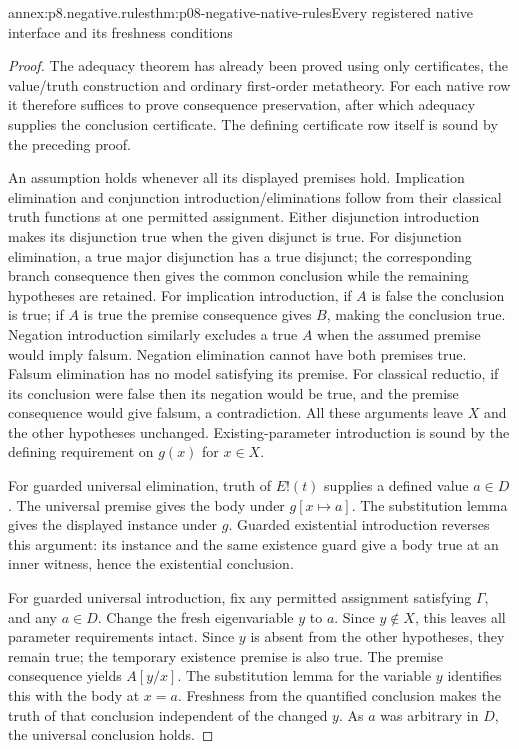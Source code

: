 \begin{annexitem}{annex:p8.negative.rules}{thm:p08-negative-native-rules}{Every registered native interface and its freshness conditions}
\begin{proof}
The adequacy theorem has already been proved using only certificates,
the value/truth construction and ordinary first-order metatheory.
For each native row it therefore suffices to prove consequence
preservation, after which adequacy supplies the conclusion certificate.
The defining certificate row itself is sound by the preceding proof.

An assumption holds whenever all its displayed premises hold.
Implication elimination and conjunction introduction/eliminations follow
from their classical truth functions at one permitted assignment.
Either disjunction introduction makes its disjunction true when the given
disjunct is true. For disjunction elimination, a true major disjunction
has a true disjunct; the corresponding branch consequence then gives the
common conclusion while the remaining hypotheses are retained.
For implication introduction, if \(A\) is false the conclusion is true;
if \(A\) is true the premise consequence gives \(B\), making the
conclusion true.  Negation introduction similarly excludes a true \(A\)
when the assumed premise would imply falsum.  Negation elimination
cannot have both premises true.  Falsum elimination has no model
satisfying its premise.  For classical reductio, if its conclusion
were false then its negation would be true, and the premise consequence
would give falsum, a contradiction.  All these arguments leave \(X\)
and the other hypotheses unchanged.  Existing-parameter introduction
is sound by the defining requirement on \(g(x)\) for \(x\in X\).

For guarded universal elimination, truth of \(E!(t)\) supplies a defined
value \(a\in D\).  The universal premise gives the body under
\(g[x\mapsto a]\).  The substitution lemma gives the displayed
instance under \(g\).  Guarded existential introduction reverses this
argument: its instance and the same existence guard give a body true
at an inner witness, hence the existential conclusion.

For guarded universal introduction, fix any permitted assignment
satisfying \(\Gamma\), and any \(a\in D\).  Change the fresh
eigenvariable \(y\) to \(a\).  Since \(y\notin X\), this leaves all
parameter requirements intact.  Since \(y\) is absent from the other
hypotheses, they remain true; the temporary existence premise is
also true.  The premise consequence yields \(A[y/x]\).
The substitution lemma for the variable \(y\) identifies this with
the body at \(x=a\).  Freshness from the quantified conclusion makes
the truth of that conclusion independent of the changed \(y\).
As \(a\) was arbitrary in \(D\), the universal conclusion holds.


\end{proof}
\end{annexitem}
